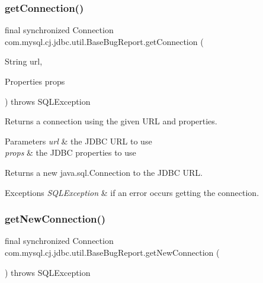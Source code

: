 \subsubsection{\texorpdfstring{get\+Connection()}{getConnection()}\hspace{0.1cm}{\footnotesize\ttfamily [3/3]}}
{\footnotesize\ttfamily final synchronized Connection com.\+mysql.\+cj.\+jdbc.\+util.\+Base\+Bug\+Report.\+get\+Connection (\begin{DoxyParamCaption}\item[{String}]{url,  }\item[{Properties}]{props }\end{DoxyParamCaption}) throws S\+Q\+L\+Exception}

Returns a connection using the given U\+RL and properties.


\begin{DoxyParams}{Parameters}
{\em url} & the J\+D\+BC U\+RL to use \\
\hline
{\em props} & the J\+D\+BC properties to use \\
\hline
\end{DoxyParams}
\begin{DoxyReturn}{Returns}
a new java.\+sql.\+Connection to the J\+D\+BC U\+RL. 
\end{DoxyReturn}

\begin{DoxyExceptions}{Exceptions}
{\em S\+Q\+L\+Exception} & if an error occurs getting the connection. \\
\hline
\end{DoxyExceptions}
\mbox{\label{classcom_1_1mysql_1_1cj_1_1jdbc_1_1util_1_1_base_bug_report_a52dfde9282d44dc1b96c28bb0d08f731}} 
\subsubsection{\texorpdfstring{get\+New\+Connection()}{getNewConnection()}}
{\footnotesize\ttfamily final synchronized Connection com.\+mysql.\+cj.\+jdbc.\+util.\+Base\+Bug\+Report.\+get\+New\+Connection (\begin{DoxyParamCaption}{ }\end{DoxyParamCaption}) throws S\+Q\+L\+Exception}

